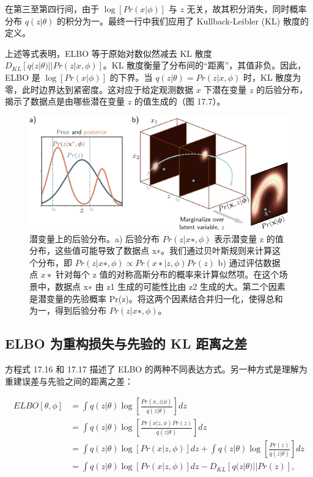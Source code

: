 在第三至第四行间，由于 \(\log[Pr(x|\phi)]\) 与 \(z\) 无关，故其积分消失，同时概率分布 \(q(z|\theta)\) 的积分为一。最终一行中我们应用了 Kullback-Leibler (KL) 散度的定义。

上述等式表明，ELBO 等于原始对数似然减去 KL 散度 \(D_{KL} [ q(z|\theta) || Pr(z|x, \phi) ]\)。KL 散度衡量了分布间的“距离”，其值非负。因此，ELBO 是 \(\log[Pr(x|\phi)]\) 的下界。当 \(q(z|\theta) = Pr(z|x, \phi)\) 时，KL 散度为零，此时边界达到紧密度。这对应于给定观测数据 \(x\) 下潜在变量 \(z\) 的后验分布，揭示了数据点是由哪些潜在变量 \(z\) 的值生成的（图 17.7）。

\begin{figure}[ht!]
\centering
\includegraphics[width=0.7\linewidth]{png/chapter17/VAENonLinearLVMPost2.png}
\caption{潜变量上的后验分布。a) 后验分布 \(Pr(z|x∗, \phi)\) 表示潜变量 z 的值分布，这些值可能导致了数据点 x∗。我们通过贝叶斯规则来计算这个分布，即 \(Pr(z|x∗, \phi) \propto Pr(x∗|z, \phi)Pr(z)\) b) 通过评估数据点 \(x∗\) 针对每个 z 值的对称高斯分布的概率来计算似然项。在这个场景中，数据点 x∗ 由 z1 生成的可能性比由 z2 生成的大。第二个因素是潜变量的先验概率 Pr(z)。将这两个因素结合并归一化，使得总和为一，得到后验分布 \(Pr(z|x∗, \phi)\)。}
\end{figure}


\subsection{ELBO 为重构损失与先验的 KL 距离之差}
方程式 17.16 和 17.17 描述了 ELBO 的两种不同表达方式。另一种方式是理解为重建误差与先验之间的距离之差：


\begin{align}
ELBO[\theta, \phi] &= \int q(z|\theta) \log \left[ \frac{Pr(x, z|\phi)}{q(z|\theta)} \right] dz \\
&= \int q(z|\theta) \log \left[ \frac{Pr(x|z, \phi)Pr(z)}{q(z|\theta)} \right] dz \\
&= \int q(z|\theta) \log [Pr(x|z, \phi)] dz + \int q(z|\theta) \log \left[ \frac{Pr(z)}{q(z|\theta)} \right] dz \\
&= \int q(z|\theta) \log [Pr(x|z, \phi)] dz - D_{KL} \left[ q(z|\theta) || Pr(z) \right], 
\end{align} 


